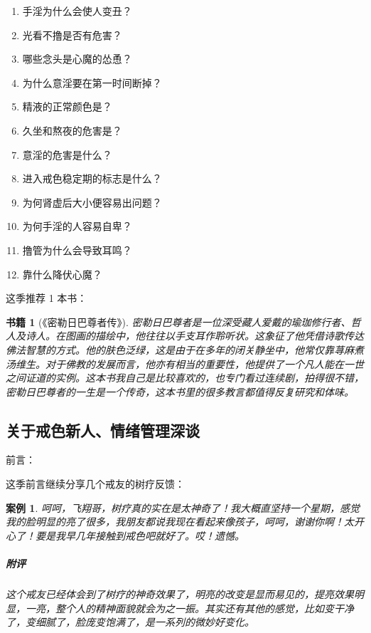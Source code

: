 \documentclass[fontset=founder]{ctexart}
\newtheorem{book}{书籍}
\newtheorem{case}{案例}
\begin{document}
\begin{multicols}{2}
\begin{enumerate}
        \item 手淫为什么会使人变丑？
        \item 光看不撸是否有危害？
        \item 哪些念头是心魔的怂恿？
        \item 为什么意淫要在第一时间断掉？
        \item 精液的正常颜色是？
        \item 久坐和熬夜的危害是？
        \item 意淫的危害是什么？
        \item 进入戒色稳定期的标志是什么？
        \item 为何肾虚后大小便容易出问题？
        \item 为何手淫的人容易自卑？
        \item 撸管为什么会导致耳鸣？
        \item 靠什么降伏心魔？
    \end{enumerate}
\end{multicols}

这季推荐 1 本书：

\begin{book}[《密勒日巴尊者传》]
    密勒日巴尊者是一位深受藏人爱戴的瑜珈修行者、哲人及诗人。在图画的描绘中，他往往以手支耳作聆听状。这象征了他凭借诗歌传达佛法智慧的方式。他的肤色泛绿，这是由于在多年的闭关静坐中，他常仅靠荨麻煮汤维生。对于佛教的发展而言，他亦有相当的重要性，他提供了一个凡人能在一世之间证道的实例。这本书我自己是比较喜欢的，也专门看过连续剧，拍得很不错，密勒日巴尊者的一生是一个传奇，这本书里的很多教言都值得反复研究和体味。
\end{book}

\subsection{关于戒色新人、情绪管理深谈}

前言：

这季前言继续分享几个戒友的树疗反馈：

\begin{case}
    呵呵，飞翔哥，树疗真的实在是太神奇了！我大概直坚持一个星期，感觉我的脸明显的亮了很多，我朋友都说我现在看起来像孩子，呵呵，谢谢你啊！太开心了！要是我早几年接触到戒色吧就好了。哎！遗憾。

    \subparagraph{附评} 这个戒友已经体会到了树疗的神奇效果了，明亮的改变是显而易见的，提亮效果明显，一亮，整个人的精神面貌就会为之一振。其实还有其他的感觉，比如变干净了，变细腻了，脸庞变饱满了，是一系列的微妙好变化。
\end{case}
\end{document}
